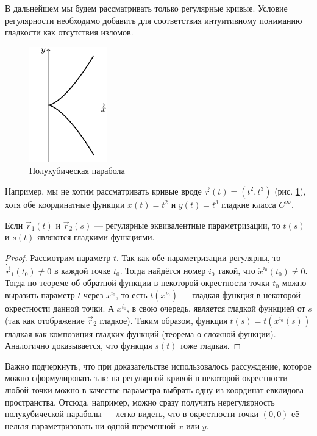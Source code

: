 В дальнейшем мы будем рассматривать только регулярные кривые. Условие регулярности необходимо добавить для соответствия интуитивному пониманию гладкости как отсутствия изломов.
\begin{figure}[h]
	\centering
	\includegraphics[height=5cm]{./img/SemicubicalParabola.pdf}
	\caption{Полукубическая парабола}
	\label{fig:SemicubicalParabola}
\end{figure}
Например, мы не хотим рассматривать кривые вроде $\vec{r}(t) = (t^2, t^3)$ (рис. \ref{fig:SemicubicalParabola}), хотя обе координатные функции $x(t) = t^2$ и $y(t) = t^3$ гладкие класса $C^\infty$.

\begin{proposition} \label{proposition:SmoothHomeomorphism}
	Если $\vec{r}_1(t)$ и $\vec{r}_2(s)$ --- регулярные эквивалентные параметризации, то $t(s)$ и $s(t)$ являются гладкими функциями.
\end{proposition}

\begin{proof}
	Рассмотрим параметр $t$. Так как обе параметризации регулярны, то $\dot{\vec{r}}_1(t_0) \ne 0$ в каждой точке $t_0$. Тогда найдётся номер $i_0$ такой, что $\dot{x}^{i_0}(t_0) \ne 0$. Тогда по теореме об обратной функции в некоторой окрестности точки $t_0$ можно выразить параметр $t$ через $x^{i_0}$, то есть $t(x^{i_0})$ --- гладкая функция в некоторой окрестности данной точки. А $x^{i_0}$, в свою очередь, является гладкой функцией от $s$ (так как отображение $\vec{r}_2$ гладкое). Таким образом, функция $t(s) = t(x^{i_0}(s))$ гладкая как композиция гладких функций (теорема о сложной функции). Аналогично доказывается, что функция $s(t)$ тоже гладкая.
\end{proof}

Важно подчеркнуть, что при доказательстве использовалось рассуждение, которое можно сформулировать так: на регулярной кривой в некоторой окрестности любой точки можно в качестве параметра выбрать одну из координат евклидова пространства. Отсюда, например, можно сразу получить нерегулярность полукубической параболы --- легко видеть, что в окрестности точки $(0, 0)$ её нельзя параметризовать ни одной переменной $x$ или $y$.

